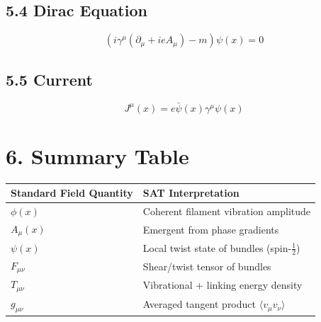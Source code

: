 \documentclass[12pt]{article}
\begin{document}
\subsection*{5.4 Dirac Equation}
\[
\left( i\gamma^\mu (\partial_\mu + ie A_\mu) - m \right) \psi(x) = 0
\]

\subsection*{5.5 Current}
\[
J^\mu(x) = e \bar{\psi}(x) \gamma^\mu \psi(x)
\]

\section*{6. Summary Table}

\begin{center}
\begin{tabular}{|l|l|}
\hline
\textbf{Standard Field Quantity} & \textbf{SAT Interpretation} \\
\hline
$\phi(x)$ & Coherent filament vibration amplitude \\
$A_\mu(x)$ & Emergent from phase gradients \\
$\psi(x)$ & Local twist state of bundles (spin-$\frac{1}{2}$) \\
$F_{\mu\nu}$ & Shear/twist tensor of bundles \\
$T_{\mu\nu}$ & Vibrational + linking energy density \\
$g_{\mu\nu}$ & Averaged tangent product $\langle v_\mu v_\nu \rangle$ \\
\hline
\end{tabular}
\end{center}
\end{document}
